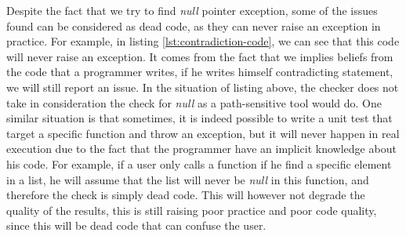 Despite the fact that we try to find \emph{null} pointer exception, some of the issues found can be considered as dead code, as they can never raise an exception in practice. 
For example, in listing \ref{lst:contradiction-code}, we can see that this code will never raise an exception. 
It comes from the fact that we implies beliefs from the code that a programmer writes, if he writes himself contradicting statement, we will still report an issue. 
In the situation of listing above, the checker does not take in consideration the check for \emph{null} as a path-sensitive tool would do. \newline
One similar situation is that sometimes, it is indeed possible to write a unit test that target a specific function and throw an exception, but it will never happen in real execution due to the fact that the programmer have an implicit knowledge about his code. 
For example, if a user only calls a function if he find a specific element in a list, he will assume that the list will never be \emph{null} in this function, and therefore the check is simply dead code. 
This will however not degrade the quality of the results, this is still raising poor practice and poor code quality, since this will be dead code that can confuse the user.










